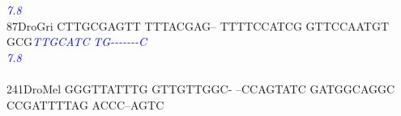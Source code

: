 \documentclass[11pt,twoside,reqno,a4paper]{article}
\begin{document}
{\hspace*{4\charwidth}\hspace*{7\charwidth}\hspace*{1\charwidth}\hspace*{1\charwidth}\hspace*{1\charwidth}\hspace*{1\charwidth}\hspace*{43\charwidth}\textit{\textcolor{Blue}{7.8}}\hspace*{1\charwidth}\hspace*{1\charwidth}\\
87\hspace*{2\charwidth}DroGri	CTTGCGAGTT	TTTACGAG--	TTTTCCATCG	GTTCCAATGT	GCG\textit{\textcolor{Blue}{T}}\textit{\textcolor{Blue}{T}}\textit{\textcolor{Blue}{G}}\textit{\textcolor{Blue}{C}}\textit{\textcolor{Blue}{A}}\textit{\textcolor{Blue}{T}}\textit{\textcolor{Blue}{C}}	\textit{\textcolor{Blue}{T}}\textit{\textcolor{Blue}{G}}\textit{\textcolor{Blue}{-}}\textit{\textcolor{Blue}{-}}\textit{\textcolor{Blue}{-}}\textit{\textcolor{Blue}{-}}\textit{\textcolor{Blue}{-}}\textit{\textcolor{Blue}{-}}\textit{\textcolor{Blue}{-}}\textit{\textcolor{Blue}{C}}	\\
\hspace*{4\charwidth}\hspace*{7\charwidth}\hspace*{1\charwidth}\hspace*{1\charwidth}\hspace*{1\charwidth}\hspace*{1\charwidth}\hspace*{43\charwidth}\textit{\textcolor{Blue}{7.8}}\hspace*{1\charwidth}\hspace*{1\charwidth}\\
\\
241\hspace*{1\charwidth}DroMel	GGGTTATTTG	GTTGTTGGC-	--CCAGTATC	GATGGCAGGC	CCGATTTTAG	ACCC--AGTC	\\
\hspace*{4\charwidth}\hspace*{7\charwidth}\hspace*{1\charwidth}\hspace*{1\charwidth}\hspace*{1\charwidth}\hspace*{1\charwidth}\hspace*{1\charwidth}\hspace*{1\charwidth}\\
}
\end{document}
